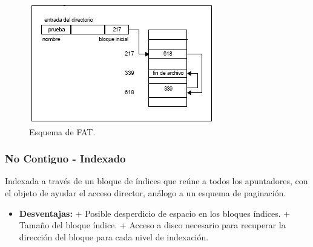 \documentclass[10pt,a4paper]{article}
\begin{document}
\begin{figure}
  \label{fig:fat}
  \caption{Esquema de FAT.}
  \centering
  \hbox{\includegraphics[width=0.5\textwidth-\fboxrule-\fboxrule]{fat.jpg}}
\end{figure}

\subsubsection{No Contiguo - Indexado}
Indexada a través de un bloque de índices que reúne a todos los apuntadores, con el objeto de ayudar el acceso director, análogo a un esquema de paginación.
\begin{itemize}
\item \textbf{Desventajas:}
\subitem + Posible desperdicio de espacio en los bloques índices.
\subitem + Tamaño del bloque índice.
\subitem + Acceso a disco necesario para recuperar la dirección del bloque para cada nivel de indexación.
\end{itemize}
\end{document}
